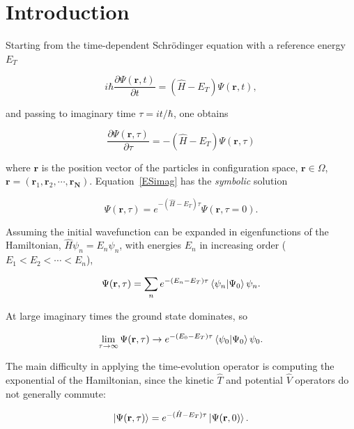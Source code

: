 \documentclass[11pt,a4paper,twoside,pdf]{article}
\numberwithin{equation}{section}
\begin{document}

\pagestyle{fancy}
\fancyhead[RO,LE]{\leftmark}
\fancyhead[LO,RE]{\thepage}
\fancyfoot{}

\newpage

\section{Introduction}

Starting from the time-dependent Schrödinger equation with a reference energy $E_T$

\begin{equation}
    i\hbar \frac{\partial \Psi (\mathbf{r}, t) }{\partial t} = (\hat{H} - E_T) \Psi (\mathbf{r}, t),
\end{equation}

and passing to imaginary time $\tau = it/\hbar$, one obtains

\begin{equation}
    \frac{\partial \Psi (\mathbf{r}, \tau) }{\partial \tau} = -(\hat{H} - E_T) \Psi (\mathbf{r}, \tau)
\label{ESimag}
\end{equation}

where $\mathbf{r}$ is the position vector of the particles in configuration space,
$\mathbf{r} \in \Omega$, $\mathbf{r} = (\mathbf{r}_1, \mathbf{r}_2, \cdots, \mathbf{r_N})$.
Equation~\ref{ESimag} has the \textit{symbolic} solution

$$
    \Psi (\mathbf{r}, \tau) = e^{-(\hat{H}-E_T)\tau} \Psi (\mathbf{r}, \tau=0).
$$

Assuming the initial wavefunction can be expanded in eigenfunctions of the
Hamiltonian, $\hat{H}\psi_n = E_n\psi_n$, with energies $E_n$ in increasing order
($E_1 < E_2 < \cdots < E_n$),

$$
    \Psi (\mathbf{r}, \tau) = \sum_{n} e^{-(E_n-E_T)\tau} \braket{\psi_n|\Psi_0} \psi_n.
$$

At large imaginary times the ground state dominates, so

$$
    \lim_{\tau \to \infty} \Psi(\mathbf{r}, \tau) \to e^{-(E_0-E_T)\tau} \braket{\psi_0|\Psi_0} \psi_0.
$$

The main difficulty in applying the time-evolution operator is computing the
exponential of the Hamiltonian, since the kinetic $\hat{T}$ and potential $\hat{V}$
operators do not generally commute:

$$
    \ket{\Psi(\mathbf{r}, \tau)} = e^{-(\hat{H}-E_T)\tau} \ket{\Psi(\mathbf{r}, 0)}.
$$
\end{document}
